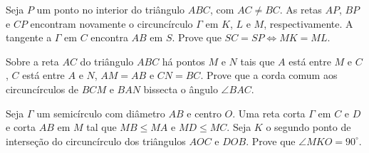 \documentclass[final, 10pt, a4paper]{article}
\begin{document}
	\begin{prob}
		Seja $P$ um ponto no interior do triângulo $ABC$, com $AC \neq BC$. As retas $AP$, $BP$ e $CP$ encontram novamente o circuncírculo $\Gamma$ em $K$, $L$ e $M$, respectivamente. A tangente a $\Gamma$ em $C$ encontra $AB$ em $S$. Prove que $SC = SP \iff MK = ML$.
	\end{prob}
	\begin{prob}
		Sobre a reta $AC$ do triângulo $ABC$ há pontos $M$ e $N$ tais que $A$ está entre $M$ e $C$, $C$ está entre $A$ e $N$, $AM = AB$ e $CN = BC$. Prove que a corda comum aos circuncírculos de $BCM$ e $BAN$ bissecta o ângulo $\angle BAC$.
	\end{prob}
	\begin{prob}
		Seja $\Gamma$ um semicírculo com diâmetro $AB$ e centro $O$. Uma reta corta $\Gamma$ em $C$ e $D$ e corta $AB$ em $M$ tal que $MB \le MA$ e $MD \le MC$. Seja $K$ o segundo ponto de interseção do circuncírculo dos triângulos $AOC$ e $DOB$. Prove que $\angle MKO = 90^\circ$.
	\end{prob}
\end{document}
